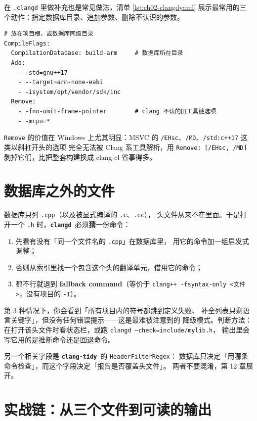 \documentclass[12pt,a4paper,fontset=fandol]{ctexbook}
\newcommand{\Lib}[1]{\textbf{\texttt{#1}}}
\newcommand{\Tidy}{\Lib{clang-tidy}}
\newcommand{\CD}{\Lib{clangd}}
\begin{document}
在 \texttt{.clangd} 里做补充也是常见做法，清单 \ref{lst:ch02-clangdyaml}
展示最常用的三个动作：指定数据库目录、追加参数、删除不认识的参数。

\begin{lstlisting}[style=yamlstyle,caption={.clangd：修数据库而不是修构建系统},label={lst:ch02-clangdyaml}]
# 放在项目根，或数据库同级目录
CompileFlags:
  CompilationDatabase: build-arm     # 数据库所在目录
  Add:
    - -std=gnu++17
    - --target=arm-none-eabi
    - -isystem/opt/vendor/sdk/inc
  Remove:
    - -fno-omit-frame-pointer        # clang 不认的旧工具链选项
    - -mcpu=*
\end{lstlisting}

\texttt{Remove} 的价值在 Windows 上尤其明显：MSVC 的
\texttt{/EHsc}、\texttt{/MD}、\texttt{/std:c++17} 这类以斜杠开头的选项
完全无法被 Clang 系工具解析，用 \texttt{Remove: [/EHsc, /MD]}
剥掉它们，比把整套构建换成 clang-cl 省事得多。

\section{数据库之外的文件}
\label{sec:ch02-s5}

数据库只列 \texttt{.cpp}（以及被显式编译的 \texttt{.c}、\texttt{.cc}），
头文件从来不在里面。于是打开一个 \texttt{.h} 时，\CD\ 必须\textbf{猜}一份命令：

\begin{enumerate}
  \item 先看有没有「同一个文件名的 \texttt{.cpp}」在数据库里，
        用它的命令加一组启发式调整；
  \item 否则从索引里找一个包含这个头的翻译单元，借用它的命令；
  \item 都不行就退到 \textbf{fallback command}（等价于
        \texttt{clang++ -fsyntax-only <文件>}，没有项目的 \texttt{-I}）。
\end{enumerate}

第 3 种情况下，你会看到「所有项目内的符号都跳到定义失败、
补全列表只剩语言关键字」，但没有任何错误提示——这是最难被注意到的
降级模式。判断方法：在打开该头文件时看状态栏，或跑
\texttt{clangd --check=include/mylib.h}，
输出里会写它用的是推断命令还是回退命令。

另一个相关字段是 \Tidy\ 的 \texttt{HeaderFilterRegex}：
数据库只决定「用哪条命令检查」，而这个字段决定「报告是否覆盖头文件」。
两者不要混淆，第 12 章展开。

\section{实战链：从三个文件到可读的输出}
\label{sec:ch02-s6}
\end{document}
